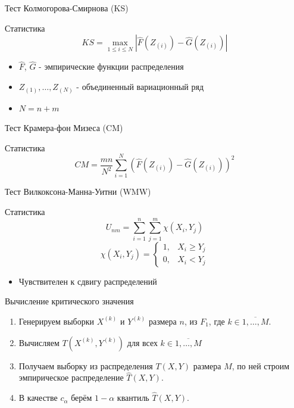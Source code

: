 \documentclass[12pt]{beamer}
\begin{document}
\begin{frame}{Тест Колмогорова-Смирнова (KS)}
	    \begin{block}{Статистика}
		        \[
		        KS = \max_{1 \leq i \leq N} |\hat{F}(Z_{(i)}) - \hat{G}(Z_{(i)})|
		        \]
		    \end{block}
	    
	    \begin{itemize}
		        \item $\hat{F}$, $\hat{G}$ - эмпирические функции распределения
		        \item $Z_{(1)}, \ldots, Z_{(N)}$ - объединенный вариационный ряд
		        \item $N = n + m$
		    \end{itemize}
	\end{frame}



\begin{frame}{Тест Крамера-фон Мизеса (CM)}
	    \begin{block}{Статистика}
		        \[
		        CM = \frac{mn}{N^2} \sum_{i=1}^N (\hat{F}(Z_{(i)}) - \hat{G}(Z_{(i)}))^2
		        \]
		    \end{block}
	    
	\end{frame}



\begin{frame}{Тест Вилкоксона-Манна-Уитни (WMW)}
	    \begin{block}{Статистика}
		        \[
		        U_{nm} = \sum_{i=1}^n \sum_{j=1}^m \chi(X_i, Y_j)
		        \]
		        \[
		        \chi(X_i, Y_j) = 
		        \begin{cases}
			        1, & X_i \geq Y_j \\
			        0, & X_i < Y_j
			        \end{cases}
		        \]
		    \end{block}
	    
	    \begin{itemize}
		        \item Чувствителен к сдвигу распределений
		    \end{itemize}
	\end{frame}

\begin{frame}{Вычисление критического значения}
	\begin{enumerate}
		\item Генерируем выборки $X^{(k)}$ и $Y^{(k)}$ размера $n$, из $F_1$, где $k \in \overline{1,\ldots, M}$.
		\pause
		\item Вычисляем $T(X^{(k)}, Y^{(k)})$ для всех $k \in \overline{1,\ldots, M}$
		\pause
		\item Получаем выборку из распределения $T(X,Y)$ размера $M$, по ней строим эмпирическое распределение $\hat{T}(X,Y)$.
		\pause
		\item В качестве $c_{\alpha}$ берём $1 - \alpha$ квантиль $\hat{T}(X,Y)$.
	\end{enumerate}
\end{frame}
\end{document}
